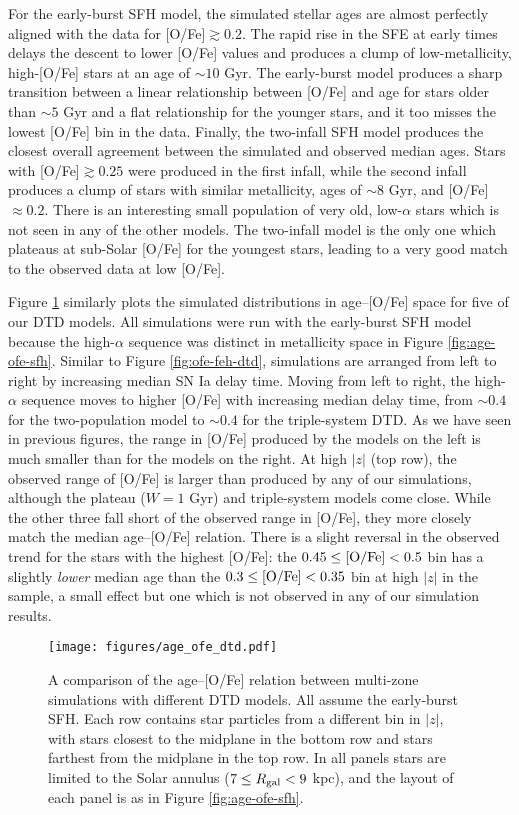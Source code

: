 \documentclass[twocolumn,twocolappendix,linenumbers,trackchanges]{aastex631}
\begin{document}
For the early-burst SFH model, the simulated stellar ages are almost perfectly aligned with the data for [O/Fe]$\gtrsim 0.2$. The rapid rise in the SFE at early times delays the descent to lower [O/Fe] values and produces a clump of low-metallicity, high-[O/Fe] stars at an age of $\sim10$ Gyr. The early-burst model produces a sharp transition between a linear relationship between [O/Fe] and age for stars older than $\sim5$ Gyr and a flat relationship for the younger stars, and it too misses the lowest [O/Fe] bin in the data. Finally, the two-infall SFH model produces the closest overall agreement between the simulated and observed median ages. Stars with [O/Fe]$\gtrsim 0.25$ were produced in the first infall, while the second infall produces a clump of stars with similar metallicity, ages of $\sim8$ Gyr, and [O/Fe]$\approx0.2$. There is an interesting small population of very old, low-$\alpha$ stars which is not seen in any of the other models. The two-infall model is the only one which plateaus at sub-Solar [O/Fe] for the youngest stars, leading to a very good match to the observed data at low [O/Fe].

Figure \ref{fig:age-ofe-dtd} similarly plots the simulated distributions in age--[O/Fe] space for five of our DTD models. All simulations were run with the early-burst SFH model because the high-$\alpha$ sequence was distinct in metallicity space in Figure \ref{fig:age-ofe-sfh}. Similar to Figure \ref{fig:ofe-feh-dtd}, simulations are arranged from left to right by increasing median SN Ia delay time. Moving from left to right, the high-$\alpha$ sequence moves to higher [O/Fe] with increasing median delay time, from $\sim0.4$ for the two-population model to $\sim0.4$ for the triple-system DTD. As we have seen in previous figures, the range in [O/Fe] produced by the models on the left is much smaller than for the models on the right. At high $|z|$ (top row), the observed range of [O/Fe] is larger than produced by any of our simulations, although the plateau ($W=1$ Gyr) and triple-system models come close. While the other three fall short of the observed range in [O/Fe], they more closely match the median age--[O/Fe] relation. There is a slight reversal in the observed trend for the stars with the highest [O/Fe]: the $0.45\leq{\rm [O/Fe]}<0.5$ bin has a slightly \textit{lower} median age than the $0.3\leq{\rm [O/Fe]}<0.35$ bin at high $|z|$ in the \citet{Leung2023-Ages} sample, a small effect but one which is not observed in any of our simulation results.

\begin{figure*}
    \centering
    \texttt{[image: figures/age\_ofe\_dtd.pdf]}
    \caption{A comparison of the age--[O/Fe] relation between multi-zone simulations with different DTD models. All assume the early-burst SFH. Each row contains star particles from a different bin in $|z|$, with stars closest to the midplane in the bottom row and stars farthest from the midplane in the top row. In all panels stars are limited to the Solar annulus ($7\leq R_{\rm gal}<9$ kpc), and the layout of each panel is as in Figure \ref{fig:age-ofe-sfh}.}
    \label{fig:age-ofe-dtd}
\end{figure*}
\end{document}
